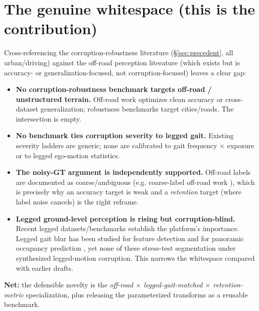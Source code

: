 \documentclass[11pt]{article}
\begin{document}
\section{The genuine whitespace (this is the contribution)}
\label{sec:whitespace}
Cross-referencing the corruption-robustness literature (\S\ref{sec:precedent}, all
urban/driving) against the off-road perception literature (which exists but is
accuracy- or generalization-focused, not corruption-focused) leaves a clear gap:
\begin{itemize}[noitemsep]
  \item \textbf{No corruption-robustness benchmark targets off-road / unstructured
        terrain.} Off-road work \cite{offseg,ganav,crossdataset} optimizes clean
        accuracy or cross-dataset generalization; robustness benchmarks
        \cite{kamann,acdc,robo3d} target cities/roads. The intersection is empty.
  \item \textbf{No benchmark ties corruption severity to legged gait.} Existing
        severity ladders are generic; none are calibrated to gait frequency
        $\times$ exposure or to legged ego-motion statistics.
  \item \textbf{The noisy-GT argument is independently supported.} Off-road labels
        are documented as coarse/ambiguous (e.g. coarse-label off-road work
        \cite{coarse}), which is precisely why an accuracy target is weak and a
        \emph{retention} target (where label noise cancels) is the right reframe.
  \item \textbf{Legged ground-level perception is rising but corruption-blind.}
        Recent legged datasets/benchmarks \cite{grandtour,oneocc,robosense} establish
        the platform's importance. Legged gait blur has been studied for feature
        detection \cite{gultekin} and for panoramic occupancy prediction
        \cite{panommocc,oneocc}, yet none of these stress-test segmentation under
        synthesized legged-motion corruption. This narrows the whitespace compared with
        earlier drafts.
\end{itemize}
\noindent\textbf{Net:} the defensible novelty is the \emph{off-road $\times$
legged-gait-matched $\times$ retention-metric} specialization, plus releasing the
parameterized transforms as a reusable benchmark.
\end{document}
